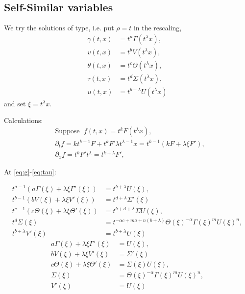\documentclass[a4paper,11pt]{article}
\begin{document}
\subsection{Self-Similar variables}
We try the solutions of type, i.e. put $\rho =t$ in the rescaling,
\begin{align*}
 \gamma(t,x) &= t^a\Gamma(t^\lambda x),\\
 v(t,x) &= t^b V(t^\lambda x),\\
 \theta(t,x) &= t^c \Theta(t^\lambda x),\\
 \tau(t,x) &= t^d \Sigma(t^\lambda x),\\
 u(t,x) &= t^{b+\lambda} U(t^\lambda x)
\end{align*}
and set $\xi = t^\lambda x$.

Calculations:
\begin{align*}
 &\text{Suppose } \; f(t,x) = t^k F(t^\lambda x),\\
 &\partial_t f = k t^{k-1} F + t^k F' \lambda t^{\lambda-1} x = t^{k-1} (kF + \lambda\xi F'),\\
 &\partial_x f = t^k F' t^\lambda = t^{k+\lambda} F',
\end{align*}

At \eqref{eq:g}-\eqref{eq:tau}:

\begin{align*}
 t^{a-1}(a \Gamma(\xi) + \lambda \xi \Gamma'(\xi)) &= t^{b+ \lambda} U(\xi),\\
 t^{b-1}(b V(\xi) + \lambda \xi V'(\xi)) &= t^{d+ \lambda} \Sigma'(\xi)\\
 t^{c-1}(c \Theta(\xi) + \lambda \xi \Theta'(\xi))&=t^{b+d+\lambda} \Sigma U(\xi),\\
 t^d\Sigma(\xi) &= t^{-\alpha c +ma +n(b+ \lambda)} \Theta(\xi)^{-\alpha} \Gamma(\xi)^m U(\xi)^n,\\
 t^{b+\lambda}V'(\xi)&=t^{b+\lambda}U(\xi)
\end{align*}
\begin{equation}
\begin{aligned}
 a \Gamma(\xi) + \lambda \xi \Gamma'(\xi) &= U(\xi),\\
 b V(\xi) + \lambda \xi V'(\xi) &= \Sigma'(\xi)\\
 c \Theta(\xi) + \lambda \xi \Theta'(\xi)&=\Sigma(\xi) U(\xi),\\
 \Sigma(\xi) &= \Theta(\xi)^{-\alpha} \Gamma(\xi)^m U(\xi)^n,\\
 V'(\xi)&=U(\xi)
\end{aligned} \label{eq:ss-odes}
\end{equation}
\end{document}

